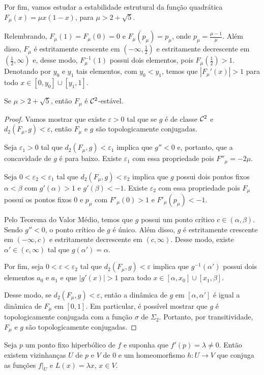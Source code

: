 Por fim, vamos estudar a estabilidade estrutural da função quadrática $F_\mu(x) = \mu x(1-x)$, para $\mu > 2 + \sqrt{5}$.

Relembrando, $F_\mu(1) = F_\mu(0) = 0$ e $F_\mu(p_\mu) = p_\mu$, onde $p_\mu = \frac{\mu - 1}{\mu}$. Além disso, $F_\mu$ é estritamente crescente em $\left(-\infty, \frac{1}{2}\right)$ e estritamente decrescente em $\left(\frac{1}{2}, \infty \right)$ e, desse modo, $F_\mu^{-1}(1)$ possui dois elementos, pois $F_\mu \left(\frac{1}{2} \right) > 1$. Denotando por $y_0$ e $y_1$ tais elementos, com $y_0 < y_1$, temos que $|F_\mu'(x)| > 1$ para todo $x \in [0, y_0] \cup [y_1, 1]$.

\begin{theorem}
Se $\mu > 2 + \sqrt{5}$, então $F_\mu$ é $\mathcal{C}^2$-estável.
\end{theorem}

\begin{proof}
Vamos mostrar que existe $\varepsilon > 0$ tal que se $g$ é de classe $\mathcal{C}^2$ e $d_2(F_\mu, g) < \varepsilon$, então $F_\mu$ e $g$ são topologicamente conjugadas.

Seja $\varepsilon_1 > 0$ tal que $d_2(F_\mu, g) < \varepsilon_1$ implica que $g'' < 0$ e, portanto, que a concavidade de $g$ é para baixo. Existe $\varepsilon_1$ com essa propriedade pois $F''_\mu = -2\mu$. 

Seja $0 < \varepsilon_2 < \varepsilon_1$ tal que $d_2(F_\mu, g) < \varepsilon_2$ implica que $g$ possui dois pontos fixos $\alpha < \beta$ com $g'(\alpha) > 1$ e $g'(\beta) < -1$. Existe $\varepsilon_2$ com essa propriedade pois $F_\mu$ possui os pontos fixos $0$ e $p_\mu$ com $F'_\mu(0) > 1$ e $F'_\mu(p_\mu) < -1$.

Pelo Teorema do Valor Médio, temos que $g$ possui um ponto crítico $c \in (\alpha, \beta)$. Sendo $g'' < 0$, o ponto crítico de $g$ é único. Além disso, $g$ é estritamente crescente em $(-\infty, c)$ e estritamente decrescente em $(c, \infty)$. Desse modo, existe $\alpha' \in (c, \infty)$ tal que $g(\alpha') = \alpha$.

Por fim, seja $0 < \varepsilon < \varepsilon_2$ tal que $d_2(F_\mu, g) < \varepsilon$ implica que $g^{-1}(\alpha')$ possui dois elementos $a_0$ e $a_1$ e que $|g'(x)| > 1$ para todo $x \in [\alpha, x_0] \cup [x_1, \beta]$.

Desse modo, se $d_2(F_\mu, g) < \varepsilon$, então a dinâmica de $g$ em $[\alpha, \alpha']$ é igual a dinâmica de $F_\mu$ em $[0, 1]$. Em particular, é possível mostrar que $g$ é topologicamente conjugada com a função $\sigma$ de $\Sigma_2$. Portanto, por transitividade, $F_\mu$ e $g$ são topologicamente conjugadas.
\end{proof}

\begin{theorem}[Hartman]
Seja $p$ um ponto fixo hiperbólico de $f$ e suponha que $f'(p) = \lambda \neq 0$. Então existem vizinhanças $U$ de $p$ e $V$ de $0$ e um homeomorfismo $h:U \to V$ que conjuga as funções $f|_U$ e $L(x) = \lambda x$, $x \in V$. 
\end{theorem}













